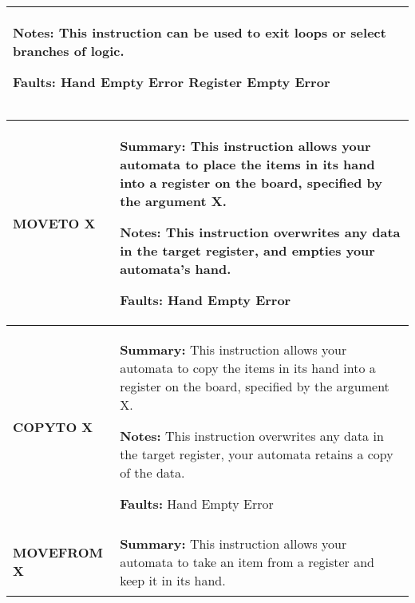 \begin{center}
\begin{tabular}{ | m{3cm} | m{11cm} | }
            \textbf{Notes:} 
            \newline This instruction can be used to exit loops or select branches of logic.

            \textbf{Faults:}
            \newline Hand Empty Error
            \newline Register Empty Error\\
        \hline
    \end{tabular}

    \begin{tabular}{ | m{3cm} | m{11cm} | } 
        \hline
            \begin{center}
                \textbf{MOVETO X} 
            \end{center}& 
            \textbf{Summary:} 
            \newline This instruction allows your automata to place the items in its hand into a register on the board, specified by the argument X.

    
            \textbf{Notes:} 
            \newline This instruction overwrites any data in the target register, and empties your automata’s hand.
    
            \textbf{Faults:}
            \newline Hand Empty Error\\
        \hline
            \begin{center}
                \textbf{COPYTO X} 
            \end{center}& 
            \textbf{Summary:} 
            \newline This instruction allows your automata to copy the items in its hand into a register on the board, specified by the argument X.
    
            \textbf{Notes:} 
            \newline This instruction overwrites any data in the target register, your automata retains a copy of the data.
    
            \textbf{Faults:}
            \newline Hand Empty Error\\
        \hline
            \begin{center}
                \textbf{MOVEFROM X} 
            \end{center}& 
            \textbf{Summary:} 
            \newline This instruction allows your automata to take an item from a register and keep it in its hand.


\end{tabular}
\end{center}
